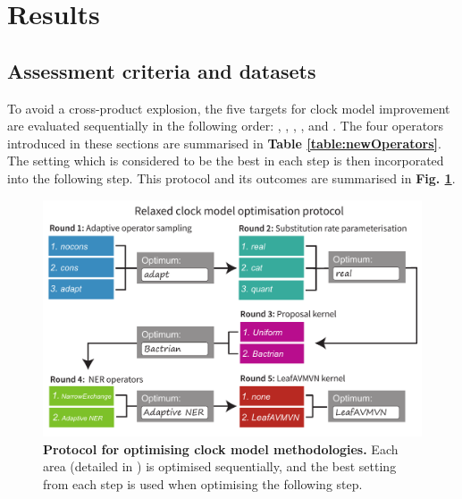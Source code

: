 \documentclass[10pt,letterpaper]{article}
\begin{document}
\clearpage
\section*{Results} \label{sect:results}





\subsection*{Assessment criteria and datasets}








To avoid a cross-product explosion, the five targets for clock model improvement are evaluated sequentially in the following order: \textbf{}, \textbf{}, \textbf{}, \textbf{}, and \textbf{}.
The four operators introduced in these sections are summarised in \textbf{Table \ref{table:newOperators}}.
The setting which is considered to be the best in each step is then incorporated into the following step. This protocol and its outcomes are summarised in \textbf{Fig. \ref{fig:tournament}}.





\begin{figure}[!h]
\includegraphics[width=\textwidth]{Figures/tournament.pdf}
\caption{\textbf{Protocol for optimising clock model methodologies.} Each area (detailed in \textbf{}) is optimised sequentially, and the best setting from each step is used when optimising the following step.}
\label{fig:tournament}
\end{figure}
\end{document}
